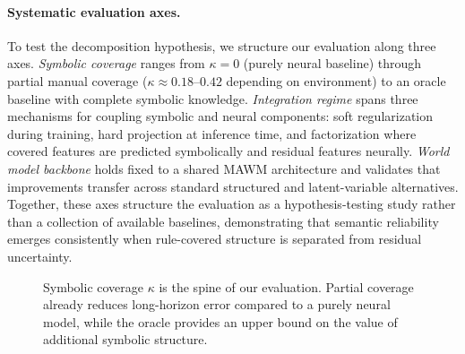 \documentclass{article}
\theoremstyle{plain}
\theoremstyle{definition}
\theoremstyle{remark}
\begin{document}
\paragraph{Systematic evaluation axes.}
To test the decomposition hypothesis, we structure our evaluation along three axes.
\emph{Symbolic coverage} ranges from $\kappa=0$ (purely neural baseline) through partial manual coverage ($\kappa \approx 0.18$--$0.42$ depending on environment) to an oracle baseline with complete symbolic knowledge.
\emph{Integration regime} spans three mechanisms for coupling symbolic and neural components: soft regularization during training, hard projection at inference time, and factorization where covered features are predicted symbolically and residual features neurally.
\emph{World model backbone} holds fixed to a shared MAWM architecture and validates that improvements transfer across standard structured and latent-variable alternatives.
Together, these axes structure the evaluation as a hypothesis-testing study rather than a collection of available baselines, demonstrating that semantic reliability emerges consistently when rule-covered structure is separated from residual uncertainty.

\begin{figure}[t]
  \centering
  \caption{Symbolic coverage $\kappa$ is the spine of our evaluation. Partial coverage already reduces long-horizon error compared to a purely neural model, while the oracle provides an upper bound on the value of additional symbolic structure.}
  \label{fig:coverage_spine}
\end{figure}
\end{document}
